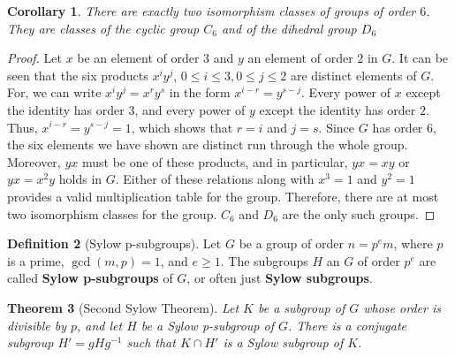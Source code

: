\documentclass[12pt]{article}
\newtheorem{thm}{Theorem}[section]
\newtheorem{cor}[thm]{Corollary}
\theoremstyle{definition}
\newtheorem{defn}[thm]{Definition}
\theoremstyle{remark}
\numberwithin{equation}{section}
\newcommand\B[1]{\textbf{ #1}}
\begin{document}
\begin{cor}
        There are exactly two isomorphism classes of groups of order $6$. They are classes of the cyclic group $C_6$ and of the dihedral group $D_6$
\end{cor}
\begin{proof}
        Let $x$ be an element of order $3$ and $y$ an element of order $2$ in $G$. It can be seen that the six products $x^iy^j$, $0\leq i \leq 3, 0 \leq j \leq 2$ are distinct elements of $G$. For, we can write $x^iy^j=x^ry^s$ in the form $x^{i-r}=y^{s-j}$. Every power of $x$ except the identity has order $3$, and every power of $y$ except the identity has order $2$. Thus, $x^{i-r} = y^{s-j} = 1$, which shows that $r=i$ and $j=s$. Since $G$ has order $6$, the six elements we have shown are distinct run through the whole group. Moreover, $yx$ must be one of these products, and in particular, $yx = xy$ or $yx =x^2y$ holds in $G$. Either of these relations along with $x^3 = 1$ and $y^2 =1$ provides a valid multiplication table for the group. Therefore, there are at most two isomorphism classes for the group. $C_6$ and $D_6$ are the only such groups.
\end{proof}

\vspace{15pt}


\begin{defn}[Sylow p-subgroups]
        Let $G$ be a group of order $n = p^em$, where $p$ is a prime, $\gcd(m,p) = 1$, and $e \geq 1$. The subgroups $H$ an $G$ of order $p^e$ are called \B{Sylow p-subgroups} of $G$, or often just \B{Sylow subgroups}.
\end{defn}


\vspace{15pt}

\begin{thm}[Second Sylow Theorem]
        Let $K$ be a subgroup of $G$ whose order is divisible by $p$, and let $H$ be a Sylow p-subgroup of $G$. There is a conjugate subgroup $H' = gHg^{-1}$ such that $K \cap H'$ is a Sylow subgroup of $K$.
\end{thm}


\vspace{15pt}
\end{document}
